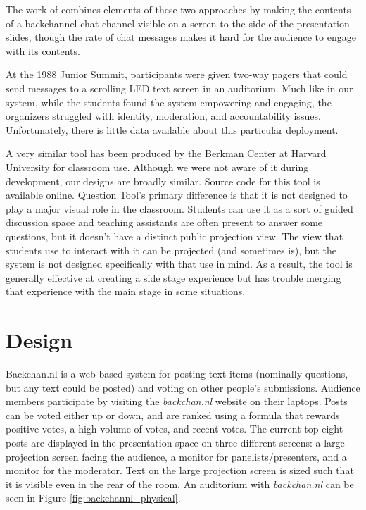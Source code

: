 The work of \citet{Rekimoto:1998jy} combines elements of these two approaches by making the contents of a backchannel chat channel visible on a screen to the side of the presentation slides, though the rate of chat messages makes it hard for the audience to engage with its contents. 

At the 1988 Junior Summit, participants were given two-way pagers that could send messages to a scrolling LED text screen in an auditorium. Much like in our system, while the students found the system empowering and engaging, the organizers struggled with identity, moderation, and accountability issues. Unfortunately, there is little data available about this particular deployment. \citep{Chesnais:uh}

A very similar tool has been produced by the Berkman Center at Harvard University for classroom use. Although we were not aware of it during development, our designs are broadly similar. Source code for this tool is available online. \citep{Anonymous:DYsIxdHV} Question Tool's primary difference is that it is not designed to play a major visual role in the classroom. Students can use it as a sort of guided discussion space and teaching assistants are often present to answer some questions, but it doesn't have a distinct public projection view. The view that students use to interact with it can be projected (and sometimes is), but the system is not designed specifically with that use in mind. As a result, the tool is generally effective at creating a side stage experience but has trouble merging that experience with the main stage in some situations. 


\section{Design}

Backchan.nl is a web-based system for posting text items (nominally questions, but any text could be posted) and voting on other people's submissions. Audience members participate by visiting the \emph{backchan.nl} website on their laptops. Posts can be voted either up or down, and are ranked using a formula that rewards positive votes, a high volume of votes, and recent votes. The current top eight posts are displayed in the presentation space on three different screens: a large projection screen facing the audience, a monitor for panelists/presenters, and a monitor for the moderator. Text on the large projection screen is sized such that it is visible even in the rear of the room. An auditorium with \emph{backchan.nl} can be seen in Figure \ref{fig:backchannl_physical}. 

